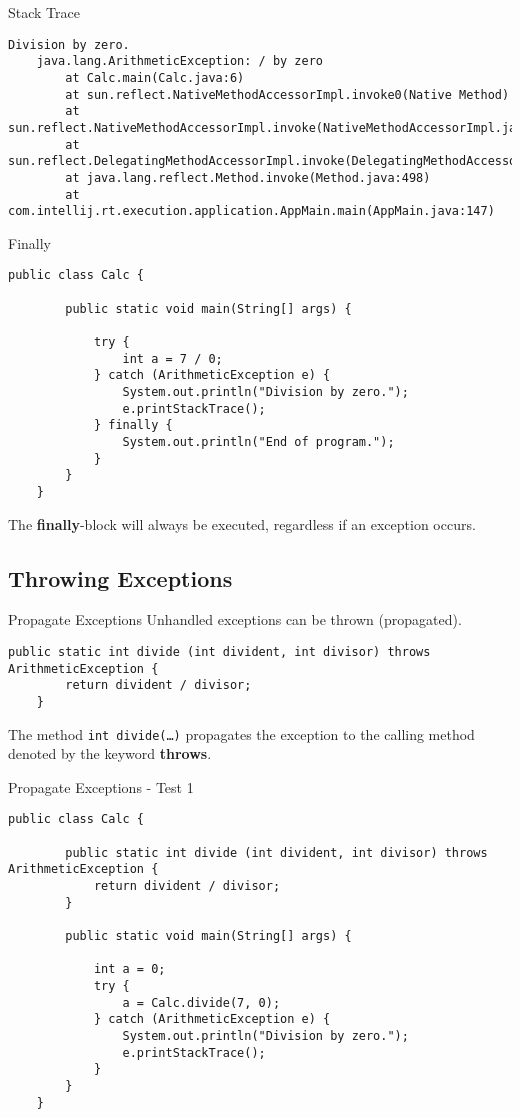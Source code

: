 \begin{frame}[fragile]{Stack Trace}
	\begin{lstlisting}[basicstyle=\ttfamily\scriptsize]
	Division by zero.
	java.lang.ArithmeticException: / by zero
		at Calc.main(Calc.java:6)
		at sun.reflect.NativeMethodAccessorImpl.invoke0(Native Method)
		at sun.reflect.NativeMethodAccessorImpl.invoke(NativeMethodAccessorImpl.java:62)
		at sun.reflect.DelegatingMethodAccessorImpl.invoke(DelegatingMethodAccessorImpl.java:43)
		at java.lang.reflect.Method.invoke(Method.java:498)
		at com.intellij.rt.execution.application.AppMain.main(AppMain.java:147)
	\end{lstlisting}
\end{frame}

\begin{frame}[fragile]{Finally}
	\begin{lstlisting}[basicstyle=\ttfamily\scriptsize]
	public class Calc {
	
	    public static void main(String[] args) {
	
	        try {
	            int a = 7 / 0;
	        } catch (ArithmeticException e) {
	            System.out.println("Division by zero.");
	            e.printStackTrace();
	        } finally {
	            System.out.println("End of program.");
	        }
	    }
	}
	\end{lstlisting}
	The \textbf{finally}-block will always be executed, regardless if an exception occurs.
\end{frame}

\subsection{Throwing Exceptions}
\begin{frame}[fragile]{Propagate Exceptions}
	Unhandled exceptions can be thrown (propagated).
	\begin{lstlisting}[basicstyle=\ttfamily\scriptsize]	
	public static int divide (int divident, int divisor) throws ArithmeticException {
	    return divident / divisor;
	}
	\end{lstlisting}
	The method \texttt{int divide(\dots)} propagates the exception to the calling
	method denoted by the keyword \textbf{throws}.
\end{frame}

\begin{frame}[fragile]{Propagate Exceptions - Test 1}
	\begin{lstlisting}[basicstyle=\ttfamily\scriptsize]
	public class Calc {
	
	    public static int divide (int divident, int divisor) throws ArithmeticException {
	        return divident / divisor;
	    }
	
	    public static void main(String[] args) {
	
	        int a = 0;
	        try {
	            a = Calc.divide(7, 0);
	        } catch (ArithmeticException e) {
	            System.out.println("Division by zero.");
	            e.printStackTrace();
	        }
	    }
	}
	\end{lstlisting}
\end{frame}

